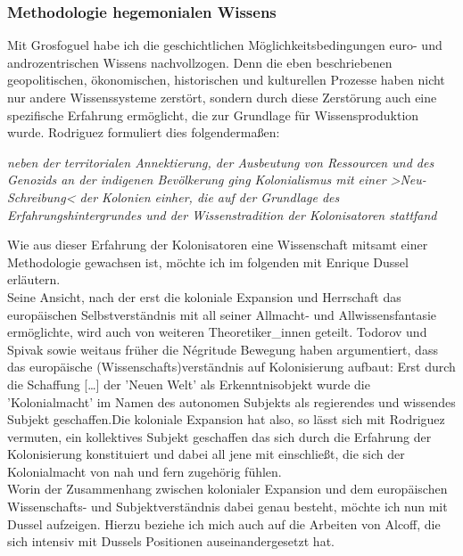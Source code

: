 \subsubsection{Methodologie hegemonialen Wissens}
Mit Grosfoguel habe ich die geschichtlichen Möglichkeitsbedingungen euro- und androzentrischen Wissens nachvollzogen. Denn die eben beschriebenen geopolitischen, ökonomischen, historischen und kulturellen Prozesse haben nicht nur andere Wissenssysteme zerstört, sondern durch diese Zerstörung auch eine spezifische Erfahrung ermöglicht, die zur Grundlage für Wissensproduktion wurde. Rodriguez formuliert dies folgendermaßen:
\begin{myenv}
  \textit{
  \glqq
[....] neben der territorialen Annektierung, der Ausbeutung von Ressourcen und des Genozids an der indigenen Bevölkerung ging Kolonialismus mit einer >Neu-Schreibung< der Kolonien einher, die auf der Grundlage des Erfahrungshintergrundes und der Wissenstradition der Kolonisatoren stattfand
\grqq } \footnotemark {}
\end{myenv}
Wie aus dieser Erfahrung der Kolonisatoren eine Wissenschaft mitsamt einer
Methodologie gewachsen ist, möchte ich im folgenden mit Enrique Dussel
erläutern. \\
Seine Ansicht, nach der erst die koloniale Expansion und Herrschaft
das europäischen Selbstverständnis mit all seiner Allmacht- und
Allwissensfantasie ermöglichte, wird auch von weiteren Theoretiker\_innen
geteilt. Todorov und Spivak sowie weitaus früher die Négritude Bewegung haben
argumentiert, dass das europäische (Wissenschafts)verständnis auf Kolonisierung
aufbaut: Erst durch die \glqq Schaffung […] der 'Neuen Welt' als
Erkenntnisobjekt wurde die 'Kolonialmacht' im Namen des autonomen Subjekts als
regierendes und wissendes Subjekt geschaffen.\grqq Die koloniale Expansion
hat also, so lässt sich mit Rodriguez vermuten, ein kollektives Subjekt
geschaffen das sich durch die Erfahrung der Kolonisierung konstituiert und
dabei all jene mit einschließt, die sich der Kolonialmacht von nah und fern
zugehörig fühlen.  \\
Worin der Zusammenhang zwischen kolonialer Expansion und dem
europäischen Wissenschafts- und Subjektverständnis dabei genau besteht, möchte
ich nun mit Dussel aufzeigen. Hierzu beziehe ich mich auch auf die Arbeiten von
Alcoff, die sich intensiv mit Dussels Positionen auseinandergesetzt hat.\\

